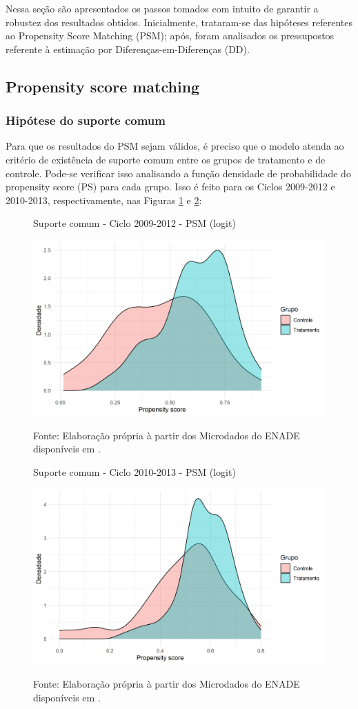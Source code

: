 Nessa seção são apresentados os passos tomados com intuito de garantir a robustez dos resultados obtidos. Inicialmente, trataram-se das hipóteses referentes ao Propensity Score Matching (PSM); após, foram analisados os pressupostos referente à estimação por Diferenças-em-Diferenças (DD).

\subsection{Propensity score matching} 

\subsubsection{Hipótese do suporte comum}

Para que os resultados do PSM sejam válidos, é preciso que o modelo atenda ao critério de existência de suporte comum entre os grupos de tratamento e de controle. Pode-se verificar isso analisando a função densidade de probabilidade do propensity score (PS) para cada grupo. Isso é feito para os Ciclos 2009-2012 e 2010-2013, respectivamente, nas Figuras \ref{fig:suporte_comum_2009_2012} e \ref{fig:suporte_comum_2010_2013}: 

\begin{figure}[H]
	\centering
	\caption{Suporte comum - Ciclo 2009-2012 - PSM (logit)}
	\label{fig:suporte_comum_2009_2012}
	\includegraphics[width=0.7\linewidth]{"Figuras/suporte_comum_2009_2012.png"} \\
\caption*{\RaggedRight Fonte: Elaboração própria à partir dos Microdados do ENADE disponíveis em \cite{INEP2020}.}
\end{figure}

\begin{figure}[H]
	\centering
	\caption{Suporte comum - Ciclo 2010-2013 - PSM (logit)}
	\label{fig:suporte_comum_2010_2013}
	\includegraphics[width=0.7\linewidth]{"Figuras/suporte_comum_2010_2013.png"} \\
\caption*{\RaggedRight Fonte: Elaboração própria à partir dos Microdados do ENADE disponíveis em \cite{INEP2020}.}
\end{figure}

